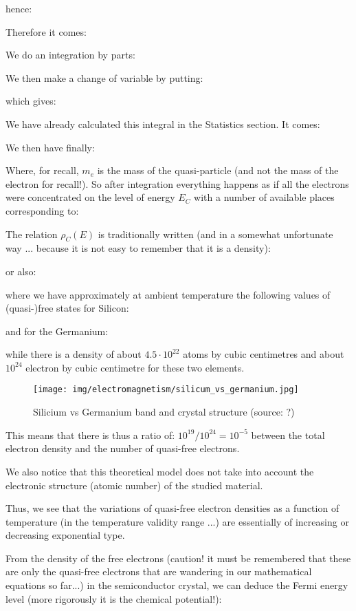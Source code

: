 	hence:
	
	Therefore it comes:
	
	We do an integration by parts:
	
	We then make a change of variable by putting:
	
	which gives:
	
	We have already calculated this integral in the Statistics section. It comes:
	
	We then have finally\label{maxwell-boltzmann density states}:
	
	Where, for recall, $m_e$ is the mass of the quasi-particle (and not the mass of the electron for recall!). So after integration everything happens as if all the electrons were concentrated on the level of energy $E_C$ with a number of available places corresponding to:
	
	The relation $\rho_C(E)$ is traditionally written (and in a somewhat unfortunate way ... because it is not easy to remember that it is a density):
	
	or also:
	
	where we have approximately at ambient temperature the following values of (quasi-)free states for Silicon:
	
	and for the Germanium:
	
	while there is a density of about $4.5\cdot 10^{22}$ atoms by cubic centimetres and about $10^{24}$ electron by cubic centimetre for these two elements.
	\begin{figure}[H]
		\centering
		\texttt{[image: img/electromagnetism/silicum\_vs\_germanium.jpg]}
		\caption[Silicium vs Germanium band and crystal structure]{Silicium vs Germanium band and crystal structure (source: ?)}
	\end{figure}
	This means that there is thus a ratio of: $10^{19}/10^{24}=10^{-5}$ between the total electron density and the number of quasi-free electrons.

	We also notice that this theoretical model does not take into account the electronic structure (atomic number) of the studied material.

	Thus, we see that the variations of quasi-free electron densities as a function of temperature (in the temperature validity range ...) are essentially of increasing or decreasing exponential type.

	From the density of the free electrons (caution! it must be remembered that these are only the quasi-free electrons that are wandering in our mathematical equations so far...) in the semiconductor crystal, we can deduce the Fermi energy level (more rigorously it is the chemical potential!):
	
